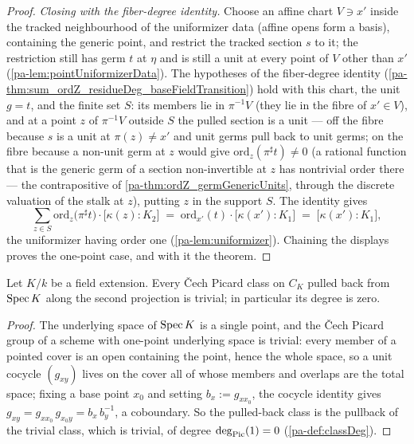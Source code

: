 \begin{proof}
  \emph{Closing with the fiber-degree identity.} Choose an affine chart
  \(V \ni x'\) inside the tracked neighbourhood of the uniformizer data (affine opens
  form a basis), containing the generic point, and restrict the tracked section
  \(s\) to it; the restriction still has germ \(t\) at \(\eta\) and is still a unit at
  every point of \(V\) other than \(x'\) (\ref{pa-lem:pointUniformizerData}). The
  hypotheses of the fiber-degree identity
  (\ref{pa-thm:sum_ordZ_residueDeg_baseFieldTransition}) hold with this chart, the unit
  \(g = t\), and the finite set \(S\): its members lie in
  \(\pi^{-1}V\) (they lie in the fibre of \(x' \in V\)), and at a point \(z\) of
  \(\pi^{-1}V\) outside \(S\) the pulled section is a unit --- off the fibre because
  \(s\) is a unit at \(\pi(z) \neq x'\) and unit germs pull back to unit germs; on the
  fibre because a non-unit germ at \(z\) would give
  \(\mathrm{ord}_z(\pi^{\sharp}t) \neq 0\) (a rational function that is the generic
  germ of a section non-invertible at \(z\) has nontrivial order there --- the
  contrapositive of \ref{pa-thm:ordZ_germGenericUnits}, through the discrete valuation of
  the stalk at \(z\)), putting \(z\) in the support \(S\). The identity gives
  \[
    \sum_{z \in S} \mathrm{ord}_z\bigl(\pi^{\sharp}t\bigr) \cdot
      \bigl[\kappa(z) : K_2\bigr]
    \;=\; \mathrm{ord}_{x'}(t) \cdot \bigl[\kappa(x') : K_1\bigr]
    \;=\; \bigl[\kappa(x') : K_1\bigr],
  \]
  the uniformizer having order one (\ref{pa-lem:uniformizer}). Chaining the displays
  proves the one-point case, and with it the theorem.
\end{proof}

\begin{lemma}
  \label{pa-lem:classDeg_picFromBase}
  \leanok

  Let \(K/k\) be a field extension. Every \v Cech Picard class on \(C_K\) pulled back
  from \(\operatorname{Spec} K\) along the second projection is trivial; in particular its degree is
  zero.
\end{lemma}
\begin{proof}
  \leanok
  The underlying space of \(\operatorname{Spec} K\) is a single point, and the \v Cech Picard group
  of a scheme with one-point underlying space is trivial: every member of a pointed
  cover is an open containing the point, hence the whole space, so a unit cocycle
  \((g_{xy})\) lives on the cover all of whose members and overlaps are the total
  space; fixing a base point \(x_0\) and setting \(b_x := g_{x x_0}\), the cocycle
  identity gives \(g_{xy} = g_{x x_0}\, g_{x_0 y} = b_x\, b_y^{-1}\), a coboundary. So
  the pulled-back class is the pullback of the trivial class, which is trivial, of
  degree \(\deg_{\operatorname{Pic}}(1) = 0\) (\ref{pa-def:classDeg}).
\end{proof}

